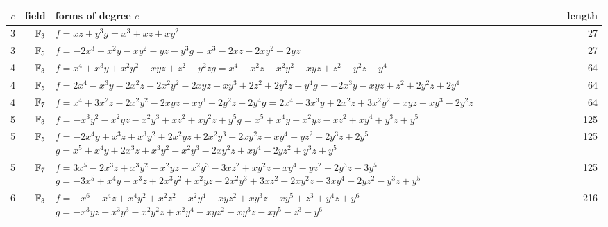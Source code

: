\begin{tabular}{@{}rr>{\raggedright\arraybackslash}p{9.6cm}r@{}}
\toprule
$e$ & field & forms of degree $e$ & length\\
\midrule
3 & $\mathbb{F}_{3}$ & $f=xz + y^{3}$\newline $g=x^{3} + xz + xy^{2}$ & 27\\
3 & $\mathbb{F}_{5}$ & $f=-2x^{3} + x^{2}y - xy^{2} - yz - y^{3}$\newline $g=x^{3} - 2xz - 2xy^{2} - 2yz$ & 27\\
4 & $\mathbb{F}_{3}$ & $f=x^{4} + x^{3}y + x^{2}y^{2} - xyz + z^{2} - y^{2}z$\newline $g=x^{4} - x^{2}z - x^{2}y^{2} - xyz + z^{2} - y^{2}z - y^{4}$ & 64\\
4 & $\mathbb{F}_{5}$ & $f=2x^{4} - x^{3}y - 2x^{2}z - 2x^{2}y^{2} - 2xyz - xy^{3} + 2z^{2} + 2y^{2}z - y^{4}$\newline $g=-2x^{3}y - xyz + z^{2} + 2y^{2}z + 2y^{4}$ & 64\\
4 & $\mathbb{F}_{7}$ & $f=x^{4} + 3x^{2}z - 2x^{2}y^{2} - 2xyz - xy^{3} + 2y^{2}z + 2y^{4}$\newline $g=2x^{4} - 3x^{3}y + 2x^{2}z + 3x^{2}y^{2} - xyz - xy^{3} - 2y^{2}z$ & 64\\
5 & $\mathbb{F}_{3}$ & $f=-x^{3}y^{2} - x^{2}yz - x^{2}y^{3} + xz^{2} + xy^{2}z + y^{5}$\newline $g=x^{5} + x^{4}y - x^{2}yz - xz^{2} + xy^{4} + y^{3}z + y^{5}$ & 125\\
5 & $\mathbb{F}_{5}$ & $f=-2x^{4}y + x^{3}z + x^{3}y^{2} + 2x^{2}yz + 2x^{2}y^{3} - 2xy^{2}z - xy^{4} + yz^{2} + 2y^{3}z + 2y^{5}$\newline $g=x^{5} + x^{4}y + 2x^{3}z + x^{3}y^{2} - x^{2}y^{3} - 2xy^{2}z + xy^{4} - 2yz^{2} + y^{3}z + y^{5}$ & 125\\
5 & $\mathbb{F}_{7}$ & $f=3x^{5} - 2x^{3}z + x^{3}y^{2} - x^{2}yz - x^{2}y^{3} - 3xz^{2} + xy^{2}z - xy^{4} - yz^{2} - 2y^{3}z - 3y^{5}$\newline $g=-3x^{5} + x^{4}y - x^{3}z + 2x^{3}y^{2} + x^{2}yz - 2x^{2}y^{3} + 3xz^{2} - 2xy^{2}z - 3xy^{4} - 2yz^{2} - y^{3}z + y^{5}$ & 125\\
6 & $\mathbb{F}_{3}$ & $f=-x^{6} - x^{4}z + x^{4}y^{2} + x^{2}z^{2} - x^{2}y^{4} - xyz^{2} + xy^{3}z - xy^{5} + z^{3} + y^{4}z + y^{6}$\newline $g=-x^{3}yz + x^{3}y^{3} - x^{2}y^{2}z + x^{2}y^{4} - xyz^{2} - xy^{3}z - xy^{5} - z^{3} - y^{6}$ & 216\\
\bottomrule
\end{tabular}
